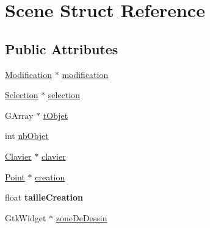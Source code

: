 \hypertarget{structScene}{
\section{Scene Struct Reference}
\label{structScene}
}
\subsection*{Public Attributes}
\begin{DoxyCompactItemize}
\item 
\hyperlink{structModification}{Modification} $\ast$ \hyperlink{structScene_afae4c847cc90d8c4419030ee2a47b888}{modification}
\item 
\hyperlink{structSelection}{Selection} $\ast$ \hyperlink{structScene_aeb68132316fb6167b13ec0fc6419e792}{selection}
\item 
GArray $\ast$ \hyperlink{structScene_a7737f3a0d0e78060f899485d4d40b3b2}{tObjet}
\item 
int \hyperlink{structScene_ab815b00097490fbb5854181b82cde7bb}{nbObjet}
\item 
\hyperlink{structClavier}{Clavier} $\ast$ \hyperlink{structScene_adf482bdfa3b26498f49d562cafdcef1c}{clavier}
\item 
\hyperlink{structPoint}{Point} $\ast$ \hyperlink{structScene_a422e7b7ebb1ae2c32748d7c2b73542d6}{creation}
\item 
\hypertarget{structScene_a9b5184aa1d1b57aa3698512789760d2d}{
float {\bfseries tailleCreation}}
\label{structScene_a9b5184aa1d1b57aa3698512789760d2d}

\item 
GtkWidget $\ast$ \hyperlink{structScene_a606000d1232ab19bb20c81ade829f8f8}{zoneDeDessin}
\end{DoxyCompactItemize}


